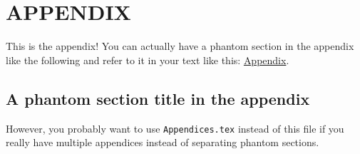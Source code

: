 
\chapter*{APPENDIX}
\label{chap:appendix}

This is the appendix! You can actually have a phantom section in the appendix like the following and refer to it in your text like this: \hyperref[sec:appendix_phantom_section]{Appendix}.

\section*{A phantom section title in the appendix}
\label{sec:appendix_phantom_section}

However, you probably want to use \verb|Appendices.tex| instead of this file if you really have multiple appendices instead of separating phantom sections.
